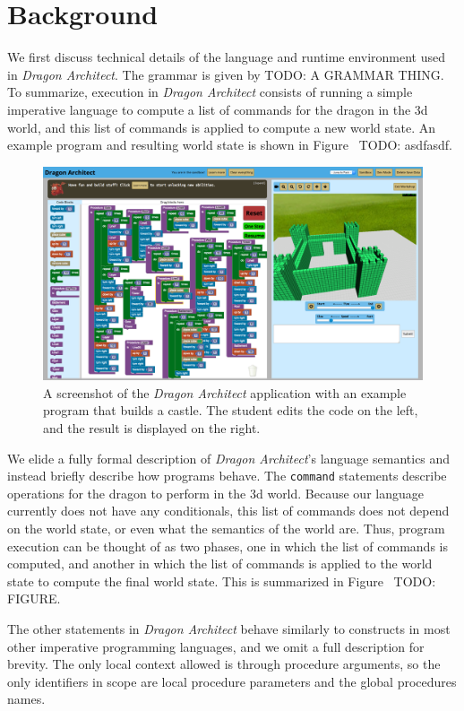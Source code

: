 \documentclass{sig-alternate}
\newcommand{\da}{\emph{Dragon Architect}}
\newcommand{\todo}[1]{{\color{red} TODO: #1}}
\begin{document}
\section{Background}

We first discuss technical details of the language and runtime environment used in \da. The grammar is given by \todo{A GRAMMAR THING}. To summarize, execution in \da{} consists of running a simple imperative language to compute a list of commands for the dragon in the 3d world, and this list of commands is applied to compute a new world state. An example program and resulting world state is shown in Figure~\todo{asdfasdf}.

\begin{figure}[t!]
  \centering
  \includegraphics[width=\textwidth]{images/full_castle}
  \caption{A screenshot of the \da{} application with an example program that builds a castle. The student edits the code on the left, and the result is displayed on the right.}
  \label{fig:full-program}
\end{figure}

We elide a fully formal description of \da's language semantics and instead briefly describe how programs behave. The \texttt{command} statements describe operations for the dragon to perform in the 3d world. Because our language currently does not have any conditionals, this list of commands does not depend on the world state, or even what the semantics of the world are. Thus, program execution can be thought of as two phases, one in which the list of commands is computed, and another in which the list of commands is applied to the world state to compute the final world state. This is summarized in Figure~\todo{FIGURE}.

The other statements in \da{} behave similarly to constructs in most other imperative programming languages, and we omit a full description for brevity. The only local context allowed is through procedure arguments, so the only identifiers in scope are local procedure parameters and the global procedures names.
\end{document}
